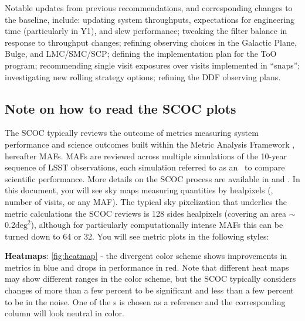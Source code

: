 Notable updates from previous recommendations, and corresponding changes to the baseline, include: updating system throughputs,  expectations for engineering time (particularly in Y1), and slew performance; tweaking the filter balance in response to throughput changes; refining observing choices in the Galactic Plane, Bulge, and LMC/SMC/SCP; defining the implementation plan for the ToO program; recommending single visit exposures over visits implemented in ``snaps''; investigating new rolling strategy options; refining the DDF observing plans.


\subsection{Note on how to read the SCOC plots}

The SCOC typically reviews the outcome of metrics measuring system performance and science outcomes built within the Metric Analysis Framework \citep{2014SPIE.9149E..0BJ}, hereafter MAFs. MAFs are reviewed across multiple simulations of the 10-year sequence of LSST observations, each simulation referred to as an \opsim\, to compare scientific performance. More details on the SCOC process are available in  and \citealt{Bianco_2022}. In this document, you will see sky maps measuring quantities by healpixels (\eg, number of visits, or any MAF). The typical sky pixelization that underlies the metric calculations the SCOC reviews is 128 sides healpixels (covering an area \mbox{$\sim$0.2$\mathrm{deg}^2$}), although for particularly computationally intense MAFs this can be turned down to 64 or 32. You will see metric plots in the following styles: 



{\bf Heatmaps}: \autoref{fig:heatmap} -
the divergent color scheme shows improvements in metrics in blue and drops in performance in red. Note that different heat maps may show different ranges in the color scheme, but the SCOC typically considers changes of more than a few percent to be significant and less than a few percent to be in the noise. One of the \opsim s is chosen as a reference and the corresponding column will look neutral in color.

